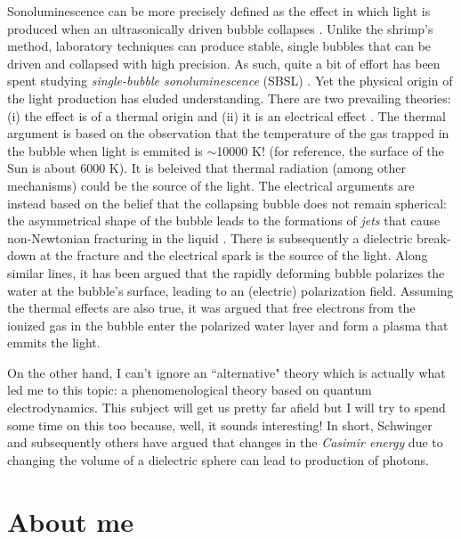 \documentclass[prl,aps,11pt,superscriptaddress,floatfix]{revtex4-2}
\begin{document}
Sonoluminescence can be more precisely defined as the effect in which light is produced when an ultrasonically driven bubble collapses \cite{borisenok2020mechanisms}. Unlike the shrimp's method, laboratory techniques can produce stable, single bubbles that can be driven and collapsed with high precision. As such, quite a bit of effort has been spent studying \emph{single-bubble sonoluminescence} (SBSL) \cite{lohse2018bubble,brenner2002single}. Yet the physical origin of the light production has eluded understanding. There are two prevailing theories: (i) the effect is of a thermal origin and (ii) it is an electrical effect \cite{borisenok2020mechanisms}. The thermal argument is based on the observation that the temperature of the gas trapped in the bubble when light is emmited is $\sim$10000 K! \cite{flannigan2005plasma,lohse2018bubble} (for reference, the surface of the Sun is about 6000 K). It is beleived that thermal radiation (among other mechanisms) could be the source of the light. The electrical arguments are instead based on the belief that the collapsing bubble does not remain spherical: the asymmetrical shape of the bubble leads to the formations of \emph{jets} that cause non-Newtonian fracturing in the liquid \cite{prosperetti1997new}. There is subsequently a dielectric break-down at the fracture and the electrical spark is the source of the light. Along similar lines, it has been argued that the rapidly deforming bubble polarizes the water at the bubble's surface, leading to an (electric) polarization field. Assuming the thermal effects are also true, it was argued that free electrons from the ionized gas in the bubble enter the polarized water layer and form a plasma that emmits the light.

On the other hand, I can't ignore an ``alternative" theory which is actually what led me to this topic: a phenomenological theory based on quantum electrodynamics. This subject will get us pretty far afield but I will try to spend some time on this too because, well, it sounds interesting! In short, Schwinger \cite{schwinger1993casimir} and subsequently others \cite{liberati2000sonoluminescence,eberlein1996sonoluminescence} have argued that changes in the \emph{Casimir energy} due to changing the volume of a dielectric sphere can lead to production of photons. 

\section{About me}
\end{document}
